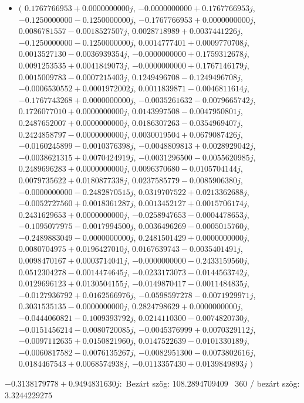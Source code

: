 \documentclass[14pt,a4paper]{article}
\begin{document}
\begin{itemize}
\item
$\big($
$0.1767766953+0.0000000000j$, $-0.0000000000+0.1767766953j$, $-0.1250000000-0.1250000000j$, $-0.1767766953+0.0000000000j$, $0.0086781557-0.0018527507j$, $0.0028718989+0.0037441226j$, $-0.1250000000-0.1250000000j$, $0.0014777401+0.0009770708j$, $0.0013527130-0.0036939354j$, $-0.0000000000+0.1759312678j$, $0.0091253535+0.0041849073j$, $-0.0000000000+0.1767146179j$, $0.0015009783-0.0007215403j$, $0.1249496708-0.1249496708j$, $-0.0006530552+0.0001972002j$, $0.0011839871-0.0046811614j$, $-0.1767743268+0.0000000000j$, $-0.0035261632-0.0079665742j$, $0.1726077010+0.0000000000j$, $0.0143997508-0.0047950801j$, $0.2487652007+0.0000000000j$, $0.0186307263-0.0354969407j$, $0.2424858797-0.0000000000j$, $0.0030019504+0.0679087426j$, $-0.0160245899-0.0010376398j$, $-0.0048809813+0.0028929042j$, $-0.0038621315+0.0070424919j$, $-0.0031296500-0.0055620985j$, $0.2489696283+0.0000000000j$, $0.0096370680-0.0105704144j$, $0.0079735622+0.0180877338j$, $0.0237585779-0.0085906380j$, $-0.0000000000-0.2482870515j$, $0.0319707522+0.0213362688j$, $-0.0052727560+0.0018361287j$, $0.0013452127+0.0015706174j$, $0.2431629653+0.0000000000j$, $-0.0258947653-0.0004478653j$, $-0.1095077975-0.0017994500j$, $0.0036496269-0.0005015760j$, $-0.2489883049-0.0000000000j$, $0.2481501429+0.0000000000j$, $0.0080704975+0.0196427010j$, $0.0167639743-0.0035401491j$, $0.0098470167+0.0003714041j$, $-0.0000000000-0.2433159560j$, $0.0512304278-0.0014474645j$, $-0.0233173073-0.0144563742j$, $0.0129696123+0.0130504155j$, $-0.0149870417-0.0011484835j$, $-0.0127936792+0.0162566976j$, $-0.0598597278-0.0071929971j$, $0.3031535135-0.0000000000j$, $0.2824798629+0.0000000000j$, $-0.0444060821-0.1009393792j$, $0.0214110300-0.0074820730j$, $-0.0151456214-0.0080720085j$, $-0.0045376999+0.0070329112j$, $-0.0097112635+0.0150821960j$, $0.0147522639-0.0101330189j$, $-0.0060817582-0.0076135267j$, $-0.0082951300-0.0073802616j$, $0.0184467543+0.0068574938j$, $-0.0113357430+0.0139849893j$
$\big)$
\end{itemize}
$-0.3138179778+0.9494831630j$:\
Bezárt szög: $108.2894709409$ \
360 / bezárt szög: $3.3244229275$\
\end{document}
